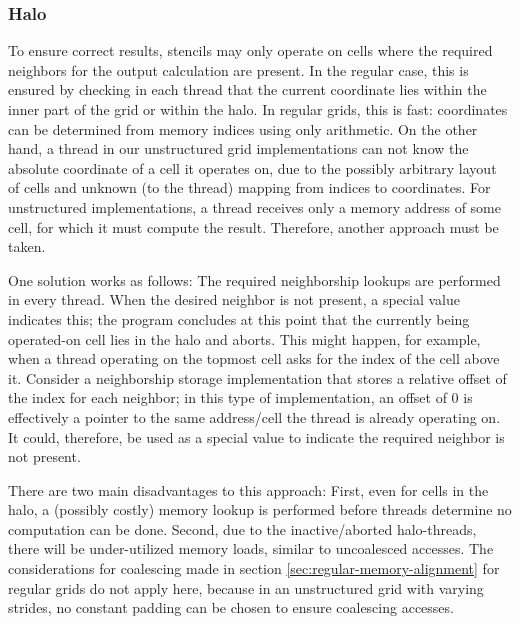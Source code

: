 \subsubsection{Halo}

To ensure correct results, stencils may only operate on cells where the required neighbors for the output calculation are present. In the regular case, this is ensured by checking in each thread that the current coordinate lies within the inner part of the grid or within the halo. In regular grids, this is fast: coordinates can be determined from memory indices using only arithmetic. On the other hand, a thread in our unstructured grid implementations can not know the absolute coordinate of a cell it operates on, due to the possibly arbitrary layout of cells and unknown (to the thread) mapping from indices to coordinates. For unstructured implementations, a thread receives only a memory address of some cell, for which it must compute the result. Therefore, another approach must be taken.

One solution works as follows: The required neighborship lookups are performed in every thread. When the desired neighbor is not present, a special value indicates this; the program concludes at this point that the currently being operated-on cell lies in the halo and aborts. This might happen, for example, when a thread operating on the topmost cell asks for the index of the cell above it. Consider a neighborship storage implementation that stores a relative offset of the index for each neighbor; in this type of implementation, an offset of $0$ is effectively a pointer to the same address/cell the thread is already operating on. It could, therefore, be used as a special value to indicate the required neighbor is not present.

There are two main disadvantages to this approach: First, even for cells in the halo, a (possibly costly) memory lookup is performed before threads determine no computation can be done. Second, due to the inactive/aborted halo-threads, there will be under-utilized memory loads, similar to uncoalesced accesses. The considerations for coalescing made in section \ref{sec:regular-memory-alignment} for regular grids do not apply here, because in an unstructured grid with varying strides, no constant padding can be chosen to ensure coalescing accesses. 


